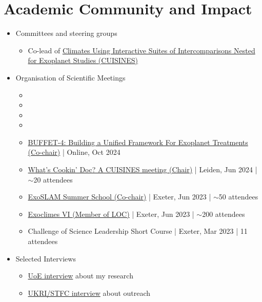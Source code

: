 \documentclass[a4paper, 11pt]{article}
\begin{document}
\section{Academic Community and Impact}
\begin{itemize}[nosep, leftmargin=10pt]
    \item Committees and steering groups
    \begin{itemize}
        \item Co-lead of \href{https://nexss.info/cuisines}{Climates Using Interactive Suites of Intercomparisons Nested for Exoplanet Studies (CUISINES)}
    \end{itemize}
    \item Organisation of Scientific Meetings
    \begin{itemize}
        \item {}
        \item {}
        \item {}
        \item {}
        \item \href{https://nexss.info/buffet-4-in-october-22nd-and-23rd-2024/}{BUFFET-4: Building a Unified Framework For Exoplanet Treatments (Co-chair)} | Online, Oct 2024
        \item \href{https://exoplanets5.org/splintersessions/}{What's Cookin' Doc? A CUISINES meeting (Chair)} | Leiden, Jun 2024 | $\sim$20 attendees
        \item \href{https://exoclim.github.ioexoclimes2023/exoslam/index.html}{ExoSLAM Summer School (Co-chair)} | Exeter, Jun 2023 | $\sim$50 attendees
        \item \href{https://exoclim.github.ioexoclimes2023}{Exoclimes VI (Member of LOC)} | Exeter, Jun 2023 | $\sim$200 attendees
        \item Challenge of Science Leadership Short Course | Exeter, Mar 2023 | 11 attendees
    \end{itemize}
    \item Selected Interviews
    \begin{itemize}
        \item \href{https://youtu.be/_Aus842EZWk}{UoE interview} about my research
        \item \href{https://youtu.be/PzQSfCwp0B8}{UKRI/STFC interview} about outreach
    \end{itemize}
\end{itemize}
\end{document}
